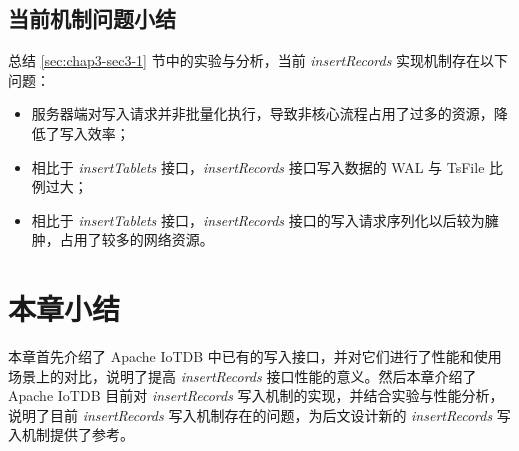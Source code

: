 \subsection{当前机制问题小结}
总结 \ref{sec:chap3-sec3-1} 节中的实验与分析，当前 \emph{insertRecords} 实现机制存在以下问题：
\begin{itemize}
  \item 服务器端对写入请求并非批量化执行，导致非核心流程占用了过多的资源，降低了写入效率；
  \item 相比于 \emph{insertTablets} 接口，\emph{insertRecords} 接口写入数据的 WAL 与 TsFile 比例过大；
  \item 相比于 \emph{insertTablets} 接口，\emph{insertRecords} 接口的写入请求序列化以后较为臃肿，占用了较多的网络资源。
\end{itemize}

\section{本章小结}
本章首先介绍了 Apache IoTDB 中已有的写入接口，并对它们进行了性能和使用场景上的对比，说明了提高 \emph{insertRecords} 接口性能的意义。然后本章介绍了 Apache IoTDB 目前对 \emph{insertRecords} 写入机制的实现，并结合实验与性能分析，说明了目前 \emph{insertRecords} 写入机制存在的问题，为后文设计新的 \emph{insertRecords} 写入机制提供了参考。

